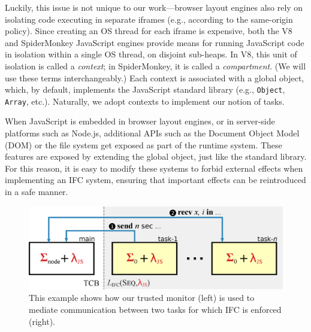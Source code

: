 Luckily, this issue is not unique to our work---browser layout engines
also rely on isolating code executing in separate iframes (e.g., according to the
same-origin policy).
%
Since creating an OS thread for each iframe is expensive, both
the V8 and SpiderMonkey JavaScript engines provide means for running
JavaScript code in isolation within a single OS thread,
on disjoint sub-heaps.
%
In V8, this unit of isolation is called a \emph{context}; in
SpiderMonkey, it is called a \emph{compartment}.
%
(We will use these terms interchangeably.)
%
Each context is associated with a global object, which, by
default, implements the JavaScript standard library (e.g.,
\verb|Object|, \verb|Array|, etc.).
%
Naturally, we adopt contexts to implement our notion of tasks.


When JavaScript is embedded in browser layout engines,
or in server-side platforms such as Node.js,
additional APIs such as the Document Object Model (DOM) or the file
system get exposed as part of the runtime system.
These features are exposed by extending the global object, just like
the standard library.  For this reason, it is easy to modify
these systems to forbid external effects when implementing
an IFC system, ensuring that important effects can be reintroduced in a safe manner.



\begin{figure}[t]
\centerline{\includegraphics[width=0.7\columnwidth]{figs/node}}
\caption{\label{fig:node}
This example shows how our trusted monitor (left) is used to mediate
communication between two tasks for which IFC is enforced (right).}
\end{figure}
%
